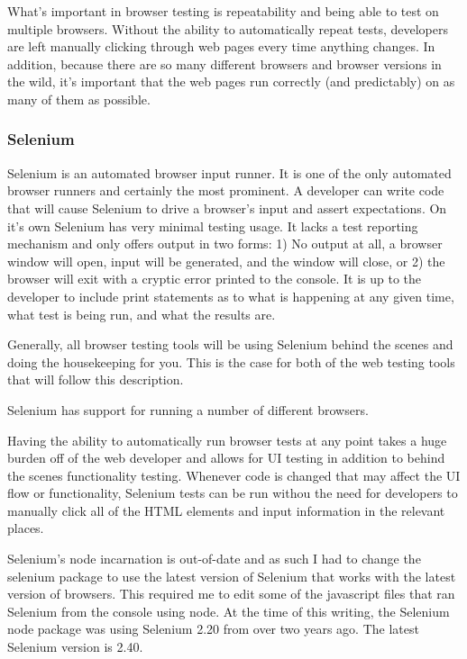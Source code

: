 \documentclass[11pt]{article}
\begin{document}
What's important in browser testing is repeatability and being able to test on multiple browsers. Without the ability to automatically repeat tests, developers are left manually clicking through web pages every time anything changes. In addition, because there are so many different browsers and browser versions in the wild, it's important that the web pages run correctly (and predictably) on as many of them as possible.

\subsubsection{Selenium\cite{Selenium}}
Selenium is an automated browser input runner. It is one of the only automated browser runners and certainly the most prominent. A developer can write code that will cause Selenium to drive a browser's input and assert expectations. On it's own Selenium has very minimal testing usage. It lacks a test reporting mechanism and only offers output in two forms: 1) No output at all, a browser window will open, input will be generated, and the window will close, or 2) the browser will exit with a cryptic error printed to the console. It is up to the developer to include print statements as to what is happening at any given time, what test is being run, and what the results are.

Generally, all browser testing tools will be using Selenium behind the scenes and doing the housekeeping for you. This is the case for both of the web testing tools that will follow this description.

Selenium has support for running a number of different browsers. 

Having the ability to automatically run browser tests at any point takes a huge burden off of the web developer and allows for UI testing in addition to behind the scenes functionality testing. Whenever code is changed that may affect the UI flow or functionality, Selenium tests can be run withou the need for developers to manually click all of the HTML elements and input information in the relevant places.

Selenium's node incarnation is out-of-date and as such I had to change the selenium package to use the latest version of Selenium that works with the latest version of browsers. This required me to edit some of the javascript files that ran Selenium from the console using node. At the time of this writing, the Selenium node package was using Selenium 2.20 from over two years ago. The latest Selenium version is 2.40.
\end{document}
